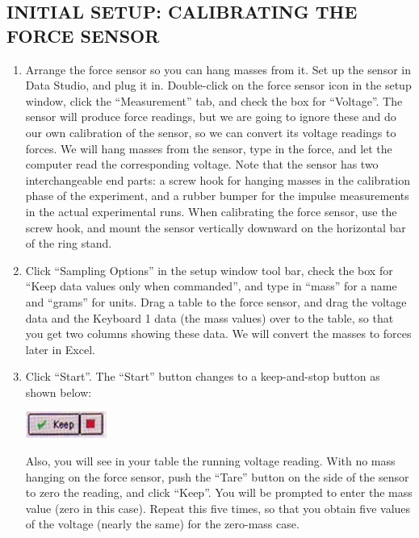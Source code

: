 \subsection*{INITIAL SETUP: CALIBRATING THE FORCE SENSOR}

\begin{enumerate}[label=\arabic*.]

\item Arrange the force sensor so you can hang masses from it.  Set up the sensor in Data Studio, and plug it in.  Double-click  on the force sensor icon in the setup window, click the ``Measurement'' tab, and check the box for ``Voltage''.  The sensor will produce force readings, but we are going to ignore these and do our own calibration of the sensor, so we can convert its voltage readings to forces.  We will hang masses from the sensor, type in the force, and let the computer read the corresponding voltage.  Note that the sensor has two interchangeable end parts: a screw hook for hanging masses in the calibration phase of the experiment, and a rubber bumper for the impulse measurements in the actual experimental runs.  When calibrating the force sensor, use the screw hook, and mount the sensor vertically downward on the horizontal bar of the ring stand.

\item Click ``Sampling Options'' in the setup window tool bar, check the box for ``Keep data values only when commanded'', and type in ``mass'' for a name and ``grams'' for units.  Drag a table to the force sensor, and drag the voltage data and the Keyboard 1 data (the mass values) over to the table, so that you get two columns showing these data.  We will convert the masses to forces later in Excel.

\item Click ``Start''.  The ``Start'' button changes to a keep-and-stop button as shown below:
\begin{center} \includegraphics*{imgs/6labs/6Alab/6Aexp5/keep_button_fx_2.jpg} \end{center}

Also, you will see in your table the running voltage reading.  With no mass hanging on the force sensor, push the ``Tare'' button on the side of the sensor to zero the reading, and click ``Keep''.  You will be prompted to enter the mass value (zero in this case).  Repeat this five times, so that you obtain five values of the voltage (nearly the same) for the zero-mass case.


\end{enumerate}
